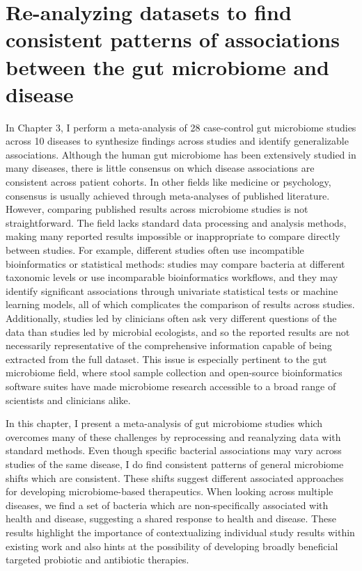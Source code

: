 \section{Re-analyzing datasets to find consistent patterns of associations between the gut microbiome and disease}

In Chapter 3, I perform a meta-analysis of 28 case-control gut microbiome studies across 10 diseases to synthesize findings across studies and identify generalizable associations.
Although the human gut microbiome has been extensively studied in many diseases, there is little consensus on which disease associations are consistent across patient cohorts.
In other fields like medicine or psychology, consensus is usually achieved through meta-analyses of published literature.
However, comparing published results across microbiome studies is not straightforward.
The field lacks standard data processing and analysis methods, making many reported results impossible or inappropriate to compare directly between studies.
For example, different studies often use incompatible bioinformatics or statistical methods: studies may compare bacteria at different taxonomic levels or use incomparable bioinformatics workflows, and they may identify significant associations through univariate statistical tests or machine learning models, all of which complicates the comparison of results across studies.
Additionally, studies led by clinicians often ask very different questions of the data than studies led by microbial ecologists, and so the reported results are not necessarily representative of the comprehensive information capable of being extracted from the full dataset.
This issue is especially pertinent to the gut microbiome field, where stool sample collection and open-source bioinformatics software suites have made microbiome research accessible to a broad range of scientists and clinicians alike.

In this chapter, I present a meta-analysis of gut microbiome studies which overcomes many of these challenges by reprocessing and reanalyzing data with standard methods.
Even though specific bacterial associations may vary across studies of the same disease, I do find consistent patterns of general microbiome shifts which are consistent.
These shifts suggest different associated approaches for developing microbiome-based therapeutics.
When looking across multiple diseases, we find a set of bacteria which are non-specifically associated with health and disease, suggesting a shared response to health and disease.
These results highlight the importance of contextualizing individual study results within existing work and also hints at the possibility of developing broadly beneficial targeted probiotic and antibiotic therapies.

